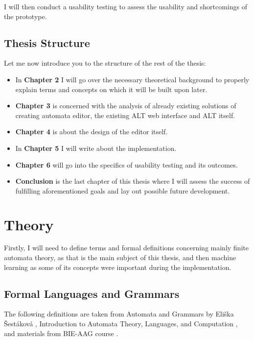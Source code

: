 I will then conduct a usability testing to assess the usability and shortcomings of the prototype.

\section{Thesis Structure}

Let me now introduce you to the structure of the rest of the thesis:

\begin{itemize}
\item In \textbf{Chapter 2} I will go over the necessary theoretical background to properly explain terms and concepts on which it will be built upon later.

\item \textbf{Chapter 3} is concerned with the analysis of already existing solutions of creating automata editor, the existing ALT web interface and ALT itself.

\item \textbf{Chapter 4} is about the design of the editor itself.

\item In \textbf{Chapter 5} I will write about the implementation.

\item \textbf{Chapter 6} will go into the specifics of usability testing and its outcomes.

\item \textbf{Conclusion} is the last chapter of this thesis where I will assess the success of fulfilling aforementioned goals and lay out possible future development.

\end{itemize}

\chapter{Theory}
\label{chap:theory}

Firstly,  I will need to define terms and formal definitions concerning mainly finite automata theory, as that is the main subject of this thesis, and then machine learning as some of its concepts were important during the implementation. 

\section{Formal Languages and Grammars}
 
The following definitions are taken from Automata and Grammars by Eliška Šestáková \cite{automata-and-grammars}, Introduction to Automata Theory, Languages, and Computation \cite{introduction-automata}, and materials from BIE-AAG course \cite{lectures}.

